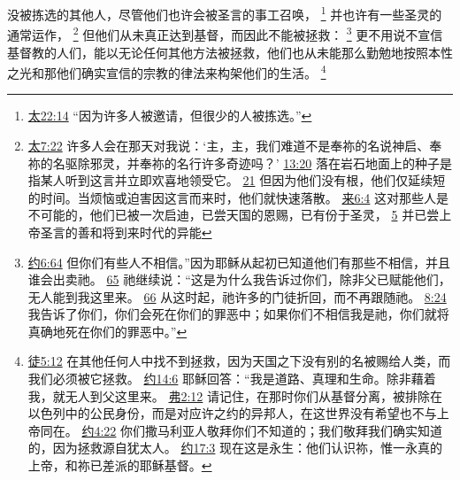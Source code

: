\documentclass[12pt, a4paper, oneside]{ctexart}
\newcounter{parnum}[section]
\newcommand{\N}{%
   \noindent\refstepcounter{parnum}%
    \makebox[\parindent][l]{\textbf{\arabic{parnum}.}}}
\begin{document}
\N 没被拣选的其他人，尽管他们也许会被圣言的事工召唤，
	\footnote {
		\href{https://biblehub.com/matthew/22-14.htm}{太22:14} “因为许多人被邀请，但很少的人被拣选。”
	}
	并也许有一些圣灵的通常运作，
	\footnote {
		\href{https://biblehub.com/matthew/7-22.htm}{太7:22} 许多人会在那天对我说：‘主，主，我们难道不是奉祢的名说神启、奉祢的名驱除邪灵，并奉祢的名行许多奇迹吗？’
		\href{https://biblehub.com/matthew/13-20.htm}{13:20} 落在岩石地面上的种子是指某人听到这言并立即欢喜地领受它。
		\href{https://biblehub.com/matthew/13-21.htm}{21} 但因为他们没有根，他们仅延续短的时间。当烦恼或迫害因这言而来时，他们就快速落散。
		\href{https://biblehub.com/hebrews/6-4.htm}{来6:4} 这对那些人是不可能的，他们已被一次启迪，已尝天国的恩赐，已有份于圣灵，
		\href{https://biblehub.com/hebrews/6-5.htm}{5} 并已尝上帝圣言的善和将到来时代的异能
	}
	但他们从未真正达到基督，而因此不能被拯救：
	\footnote {
		\href{https://biblehub.com/john/6-64.htm}{约6:64} 但你们有些人不相信。”因为耶稣从起初已知道他们有那些不相信，并且谁会出卖祂。
		\href{https://biblehub.com/john/6-65.htm}{65} 祂继续说：“这是为什么我告诉过你们，除非父已赋能他们，无人能到我这里来。
		\href{https://biblehub.com/john/6-66.htm}{66} 从这时起，祂许多的门徒折回，而不再跟随祂。
		\href{https://biblehub.com/john/8-24.htm}{8:24} 我告诉了你们，你们会死在你们的罪恶中；如果你们不相信我是祂，你们就将真确地死在你们的罪恶中。”
	}
	更不用说不宣信基督教的人们，能以无论任何其他方法被拯救，他们也从未能那么勤勉地按照本性之光和那他们确实宣信的宗教的律法来构架他们的生活。
	\footnote {
		\href{https://biblehub.com/acts/4-12.htm}{徒5:12} 在其他任何人中找不到拯救，因为天国之下没有别的名被赐给人类，而我们必须被它拯救。
		\href{https://biblehub.com/john/14-6.htm}{约14:6} 耶稣回答：“我是道路、真理和生命。除非藉着我，就无人到父这里来。
		\href{https://biblehub.com/ephesians/2-12.htm}{弗2:12} 请记住，在那时你们从基督分离，被排除在以色列中的公民身份，而是对应许之约的异邦人，在这世界没有希望也不与上帝同在。
		\href{https://biblehub.com/john/4-22.htm}{约4:22} 你们撒马利亚人敬拜你们不知道的；我们敬拜我们确实知道的，因为拯救源自犹太人。
		\href{https://biblehub.com/john/17-3.htm}{约17:3} 现在这是永生：他们认识祢，惟一永真的上帝，和祢已差派的耶稣基督。
	}
\end{document}
